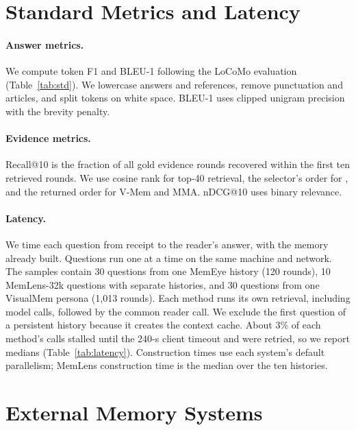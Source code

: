 \section{Standard Metrics and Latency}
\label{app:latency}



\paragraph{Answer metrics.} We compute token F1 and BLEU-1 following the LoCoMo evaluation (Table~\ref{tab:std}). We lowercase answers and references, remove punctuation and articles, and split tokens on white space. BLEU-1 uses clipped unigram precision with the brevity penalty.

\paragraph{Evidence metrics.} Recall@10 is the fraction of all gold evidence rounds recovered within the first ten retrieved rounds. We use cosine rank for top-40 retrieval, the selector's order for \vgs{}, and the returned order for V-Mem and MMA. nDCG@10 uses binary relevance.

\paragraph{Latency.} We time each question from receipt to the reader's answer, with the memory already built. Questions run one at a time on the same machine and network. The samples contain 30 questions from one MemEye history (120 rounds), 10 MemLens-32k questions with separate histories, and 30 questions from one VisualMem persona (1,013 rounds). Each method runs its own retrieval, including model calls, followed by the common reader call. We exclude the first question of a persistent history because it creates the context cache. About 3\% of each method's calls stalled until the 240-s client timeout and were retried, so we report medians (Table~\ref{tab:latency}). Construction times use each system's default parallelism; MemLens construction time is the median over the ten histories.



\section{External Memory Systems}
\label{app:baselines}

